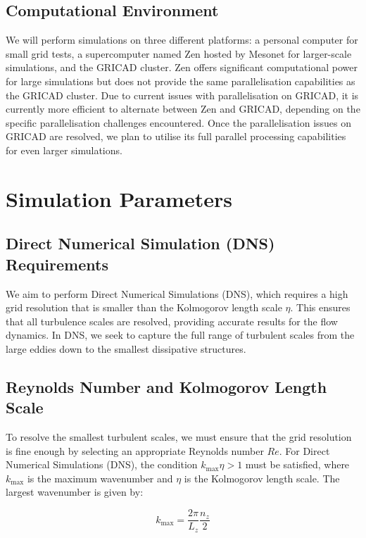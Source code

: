 \documentclass[final,5p,times,twocolumn,authoryear]{elsarticle}
\begin{document}
\subsection{Computational Environment}
We will perform simulations on three different platforms: a personal computer for small grid tests, a supercomputer named Zen hosted by Mesonet for larger-scale simulations, and the GRICAD cluster. Zen offers significant computational power for large simulations but does not provide the same parallelisation capabilities as the GRICAD cluster. Due to current issues with parallelisation on GRICAD, it is currently more efficient to alternate between Zen and GRICAD, depending on the specific parallelisation challenges encountered. Once the parallelisation issues on GRICAD are resolved, we plan to utilise its full parallel processing capabilities for even larger simulations.

\section{Simulation Parameters}
\subsection{Direct Numerical Simulation (DNS) Requirements}

We aim to perform Direct Numerical Simulations (DNS), which requires a high grid resolution that is smaller than the Kolmogorov length scale $\eta$. This ensures that all turbulence scales are resolved, providing accurate results for the flow dynamics. In DNS, we seek to capture the full range of turbulent scales from the large eddies down to the smallest dissipative structures.

\subsection{Reynolds Number and Kolmogorov Length Scale}

To resolve the smallest turbulent scales, we must ensure that the grid resolution is fine enough by selecting an appropriate Reynolds number $Re$. For Direct Numerical Simulations (DNS), the condition $k_{\text{max}} \eta > 1$ must be satisfied, where $k_{\text{max}}$ is the maximum wavenumber and $\eta$ is the Kolmogorov length scale. The largest wavenumber is given by:

\begin{equation*}
k_{\text{max}} = \frac{2\pi}{L_z} \frac{n_z}{2}
\end{equation*}
\end{document}
